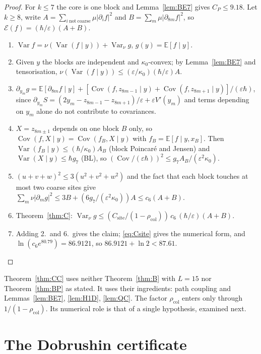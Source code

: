 \documentclass[11pt,a4paper]{article}
\theoremstyle{definition}
\theoremstyle{remark}
\newcommand{\E}{\mathbb{E}}
\newcommand{\Var}{\operatorname{Var}}
\newcommand{\Cov}{\operatorname{Cov}}
\newcommand{\cE}{\mathcal{E}}
\newcommand{\rcol}{\rho_{\mathrm{col}}}
\newcommand{\Csite}{C_{\mathrm{site}}}
\begin{document}
\begin{proof}
For $k\le7$ the core is one block and Lemma~\ref{lem:BE7} gives $C_P\le9.18$. Let $k\ge8$, write $A=\sum_{i\ \mathrm{not\ coarse}}\mu|\partial_if|^2$ and $B=\sum_m\mu|\partial_{8m}f|^2$, so $\cE(f)=(\hbar/\varepsilon)(A+B)$.
\begin{enumerate}[leftmargin=*,label=\arabic*.]
\item $\Var f=\nu(\Var(f\mid y))+\Var_\nu g$, $g(y)=\E[f\mid y]$.
\item Given $y$ the blocks are independent and $\kappa_0$-convex; by Lemma~\ref{lem:BE7} and tensorisation, $\nu(\Var(f\mid y))\le(\varepsilon/\kappa_0)(\hbar/\varepsilon)A$.
\item $\partial_{y_m}g=\E[\partial_{8m}f\mid y]+[\Cov(f,z_{8m-1}\mid y)+\Cov(f,z_{8m+1}\mid y)]/(\varepsilon\hbar)$, since $\partial_{y_m}S=(2y_m-z_{8m-1}-z_{8m+1})/\varepsilon+\varepsilon V'(y_m)$ and terms depending on $y_m$ alone do not contribute to covariances.
\item $X=z_{8m\pm1}$ depends on one block $B$ only, so $\Cov(f,X\mid y)=\Cov(f_B,X\mid y)$ with $f_B=\E[f\mid y,x_B]$. Then $\Var(f_B\mid y)\le(\hbar/\kappa_0)A_B$ (block Poincar\'e and Jensen) and $\Var(X\mid y)\le\hbar g_7$ (BL), so $(\Cov/(\varepsilon\hbar))^2\le g_7A_B/(\varepsilon^2\kappa_0)$.
\item $(u+v+w)^2\le3(u^2+v^2+w^2)$ and the fact that each block touches at most two coarse sites give $\sum_m\nu|\partial_mg|^2\le3B+(6g_7/(\varepsilon^2\kappa_0))A\le c_6(A+B)$.
\item Theorem~\ref{thm:C}: $\Var_\nu g\le(\Csite/(1-\rcol))\,c_6\,(\hbar/\varepsilon)(A+B)$.
\item Adding 2.\ and 6.\ gives the claim; \eqref{eq:Csite} gives the numerical form, and $\ln(c_6e^{80.79})=86.9121$, so $86.9121+\ln2<87.61$.\qedhere
\end{enumerate}
\end{proof}

Theorem~\ref{thm:CC} uses neither Theorem~\ref{thm:B} with $L=15$ nor Theorem~\ref{thm:BP} as stated. It uses their ingredients: path coupling and Lemmas~\ref{lem:BE7}, \ref{lem:H1D}, \ref{lem:QC}. The factor $\rcol$ enters only through $1/(1-\rcol)$. Its numerical role is that of a single hypothesis, examined next.

\section{The Dobrushin certificate}\label{sec:DOB}
\end{document}
